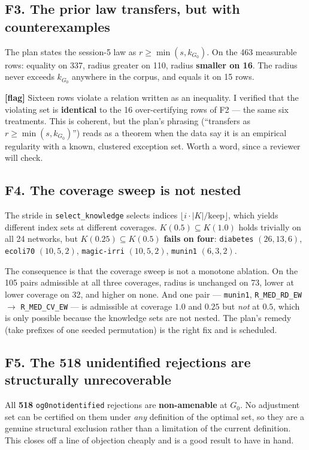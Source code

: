 \documentclass[11pt,a4paper]{article}
\newcommand{\code}[1]{\texttt{\small\hspace{0pt}#1}}
\newcommand{\ul}{\discretionary{\_}{}{\_}}
\newcommand{\flag}{\textcolor{warn}{\textbf{[flag]}}}
\begin{document}
\subsection{F3. The prior law transfers, but with counterexamples}

The plan states the session-5 law as $r \geq \min(s, k_{G_0})$. On the 463 measurable rows:
equality on 337, radius greater on 110, radius \textbf{smaller on 16}. The radius never exceeds
$k_{G_0}$ anywhere in the corpus, and equals it on 15 rows.

\flag{} Sixteen rows violate a relation written as an inequality. I verified that the violating set
is \textbf{identical} to the 16 over-certifying rows of F2 --- the same six treatments. This is
coherent, but the plan's phrasing (``transfers as $r \geq \min(s, k_{G_0})$'') reads as a theorem
when the data say it is an empirical regularity with a known, clustered exception set. Worth a
word, since a reviewer will check.

\subsection{F4. The coverage sweep is not nested}

The stride in \code{select\_knowledge} selects indices $\lfloor i \cdot |K|/\text{keep} \rfloor$,
which yields different index sets at different coverages. $K(0.5) \subseteq K(1.0)$ holds trivially
on all 24 networks, but $K(0.25) \subseteq K(0.5)$ \textbf{fails on four}: \code{diabetes}
$(26,13,6)$, \code{ecoli70} $(10,5,2)$, \code{magic-irri} $(10,5,2)$, \code{munin1} $(6,3,2)$.

The consequence is that the coverage sweep is not a monotone ablation. On the 105 pairs admissible
at all three coverages, radius is unchanged on 73, lower at lower coverage on 32, and higher on
none. And one pair --- \code{munin1}, \code{R\_MED\_RD\_EW} $\to$ \code{R\_MED\_CV\_EW} --- is
admissible at coverage $1.0$ and $0.25$ but \emph{not} at $0.5$, which is only possible because the
knowledge sets are not nested. The plan's remedy (take prefixes of one seeded permutation) is the
right fix and is scheduled.

\subsection{F5. The 518 unidentified rejections are structurally unrecoverable}

All \textbf{518} \code{o\ul g0\ul not\ul identified} rejections are \textbf{non-amenable} at $G_0$. No
adjustment set can be certified on them under \emph{any} definition of the optimal set, so they are
a genuine structural exclusion rather than a limitation of the current definition. This closes off
a line of objection cheaply and is a good result to have in hand.
\end{document}
